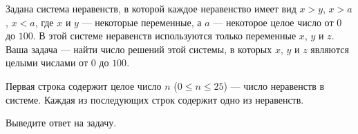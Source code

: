 Задана система неравенств, в которой каждое неравенство имеет вид $x > y$, $x > a$, $x < a$, где $x$ и $y$ --- некоторые переменные, а $a$ --- некоторое целое число от $0$ до $100$. В этой системе неравенств используются только переменные $x$, $y$ и $z$. 
Ваша задача --- найти число решений этой системы, в которых $x$, $y$ и $z$ являются целыми числами от $0$ до $100$. 

\InputFile

Первая строка содержит целое число $n$ ($0 \le n \le 25$) --- число неравенств в системе. Каждая из последующих строк содержит одно из неравенств. 

\OutputFile

Выведите ответ на задачу. 

\SAMPLES

